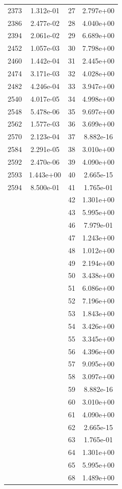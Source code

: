 \documentclass[12pt]{article}
\begin{document}
\begin{longtable}{@{}cccc@{}}
2373 & 1.312e-01 & 27 & 2.797e+00 \\
2386 & 2.477e-02 & 28 & 4.040e+00 \\
2394 & 2.061e-02 & 29 & 6.689e+00 \\
2452 & 1.057e-03 & 30 & 7.798e+00 \\
2460 & 1.442e-04 & 31 & 2.445e+00 \\
2474 & 3.171e-03 & 32 & 4.028e+00 \\
2482 & 4.246e-04 & 33 & 3.947e+00 \\
2540 & 4.017e-05 & 34 & 4.998e+00 \\
2548 & 5.478e-06 & 35 & 9.697e+00 \\
2562 & 1.577e-03 & 36 & 3.699e+00 \\
2570 & 2.123e-04 & 37 & 8.882e-16 \\
2584 & 2.291e-05 & 38 & 3.010e+00 \\
2592 & 2.470e-06 & 39 & 4.090e+00 \\
2593 & 1.443e+00 & 40 & 2.665e-15 \\
2594 & 8.500e-01 & 41 & 1.765e-01 \\
 &  & 42 & 1.301e+00 \\
 &  & 43 & 5.995e+00 \\
 &  & 46 & 7.979e-01 \\
 &  & 47 & 1.243e+00 \\
 &  & 48 & 1.012e+00 \\
 &  & 49 & 2.194e+00 \\
 &  & 50 & 3.438e+00 \\
 &  & 51 & 6.086e+00 \\
 &  & 52 & 7.196e+00 \\
 &  & 53 & 1.843e+00 \\
 &  & 54 & 3.426e+00 \\
 &  & 55 & 3.345e+00 \\
 &  & 56 & 4.396e+00 \\
 &  & 57 & 9.095e+00 \\
 &  & 58 & 3.097e+00 \\
 &  & 59 & 8.882e-16 \\
 &  & 60 & 3.010e+00 \\
 &  & 61 & 4.090e+00 \\
 &  & 62 & 2.665e-15 \\
 &  & 63 & 1.765e-01 \\
 &  & 64 & 1.301e+00 \\
 &  & 65 & 5.995e+00 \\
 &  & 68 & 1.489e+00 \\

\end{longtable}
\end{document}
